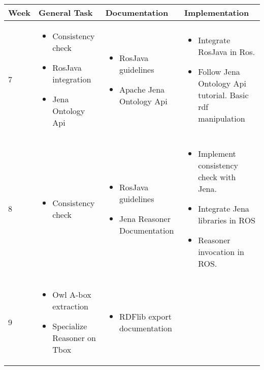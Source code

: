 \begin{center}
    \begin{tabular}{ | l | p{4cm} | p{4cm} | p{5cm} |}
    \hline
    Week & General Task & Documentation & Implementation \\ \hline
    7 & \begin{itemize}
     \item Consistency check
     \item RosJava integration
     \item Jena Ontology Api
     \end{itemize} 
     & \begin{itemize}
     \item RosJava guidelines \cite{bib12}
     \item Apache Jena Ontology Api \cite{bib13}
     \end{itemize} 
      & \begin{itemize}
     \item Integrate RosJava in Ros.
     \item Follow Jena Ontology Api tutorial. Basic rdf manipulation
    \end{itemize}  \\
    \hline
    8 & \begin{itemize}
     \item Consistency check
     \end{itemize} 
     & \begin{itemize}
     \item RosJava guidelines \cite{bib12}
     \item Jena Reasoner Documentation \cite{bib14}
     \end{itemize} 
      & \begin{itemize}
     \item Implement consistency check with Jena.
     \item Integrate Jena libraries in ROS
     \item Reasoner invocation in ROS.
    \end{itemize}  \\
    \hline
    9 & \begin{itemize}
     \item Owl A-box extraction
     \item Specialize Reasoner on Tbox
     \end{itemize} 
     & \begin{itemize}
     \item RDFlib export documentation     

\end{itemize}
\end{tabular}
\end{center}
